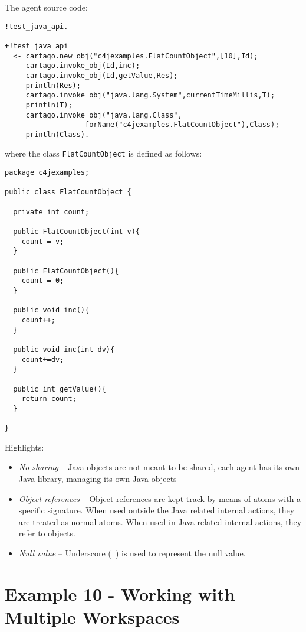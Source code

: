 \documentclass[11pt]{report}
\newcommand\code[1]{{\small{\mbox{\texttt{{#1}}}}}}
\begin{document}
%
\noindent The agent source code:
%
{\small{\begin{verbatim}
!test_java_api.

+!test_java_api
  <- cartago.new_obj("c4jexamples.FlatCountObject",[10],Id);
     cartago.invoke_obj(Id,inc);
     cartago.invoke_obj(Id,getValue,Res);
     println(Res);
     cartago.invoke_obj("java.lang.System",currentTimeMillis,T);
     println(T);
     cartago.invoke_obj("java.lang.Class",
                   forName("c4jexamples.FlatCountObject"),Class);
     println(Class).
\end{verbatim}}}
%
\noindent where the class \code{FlatCountObject} is defined as follows:
{\small{\begin{verbatim}
package c4jexamples;

public class FlatCountObject {

  private int count;
  
  public FlatCountObject(int v){
    count = v;
  }

  public FlatCountObject(){
    count = 0;
  }
  
  public void inc(){
    count++;
  }

  public void inc(int dv){
    count+=dv;
  }
  
  public int getValue(){
    return count;
  }

}
\end{verbatim}}}

\noindent Highlights:
%
\begin{itemize}
%
\item \emph{No sharing} -- Java objects are not meant to be shared, each agent has its own Java library, managing its own Java objects
\item \emph{Object references} -- Object references are kept track by means of atoms with a specific signature. When used outside the Java related internal actions, they are treated as normal atoms. When used in Java related internal actions, they refer to objects.
\item \emph{Null value} -- Underscore (\code{\_}) is used to represent the null value. 
%
\end{itemize} 


\newpage
\section{Example 10 - Working with Multiple Workspaces}
\end{document}
